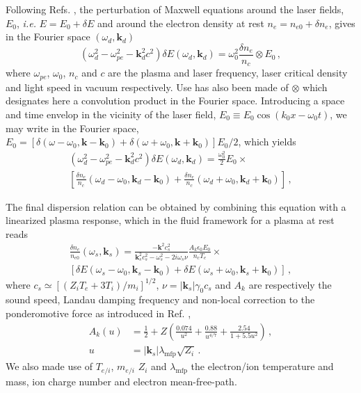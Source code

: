 \documentclass[
 reprint,
 amsmath,amssymb,
 aps,
]{revtex4-1}
\begin{document}
Following Refs. \cite[]{Kruer,phd_Michel}, the perturbation of Maxwell equations around the laser fields, $E_0$, \emph{i.e.} $E = E_0 + \delta E$ and around the  electron density at rest $n_e = n_{e0}+\delta n_e$, gives in the Fourier space $(\omega_d,\mathbf{k}_d)$
\begin{equation}
    (\omega_d^2 - \omega_{pe}^2 -\mathbf{k}_d^2c^2)\delta E(\omega_d,\mathbf{k}_d) = \omega_0^2 \frac{\delta n_e }{n_c}\otimes E_0  \, ,\label{eq:max1}
\end{equation}
where $\omega_{pe}$, $\omega_{0}$,  $n_c$ and $c$ are the plasma and laser frequency, laser critical density and light speed in vacuum respectively. Use has also been made of $\otimes$ which designates  here a convolution product in the Fourier space.
Introducing a space and time envelop in the vicinity of the laser field, $E_0\equiv E_0 \cos(k_0 x - \omega_0t)$,
we may write in the Fourier space,  $E_0 =[ \delta(\omega-\omega_0, \mathbf{k}-\mathbf{k}_0) + \delta(\omega+\omega_0, \mathbf{k}+\mathbf{k}_0) ]E_0/2 $, which yields 
\begin{align}
    (\omega_d^2 - \omega_{pe}^2 -\mathbf{k}_d^2c^2)\delta E(\omega_d,\mathbf{k}_d) = \frac{\omega_0^2}{2} E_0\times \nonumber\\ \left[\frac{\delta n_e }{n_c}(\omega_d-\omega_0, \mathbf{k}_d-\mathbf{k}_0) +\frac{\delta n_e }{n_c}(\omega_d+\omega_0, \mathbf{k}_d+\mathbf{k}_0) \right] \, ,\label{eq:max2}
\end{align}

The final dispersion relation  can be obtained by combining this equation with a linearized plasma response, which in the fluid framework for a plasma at rest %
reads 
\begin{align}
   \frac{\delta n_e }{n_{e0}}(\omega_s,\mathbf{k}_s) = \frac{-\mathbf{k}^2c_s^2}{ \mathbf{k}_s^2c_s^2-\omega_s^2 -2i\omega_s \nu} \frac{A_k\epsilon_0 E_0}{n_c T_e}\times \nonumber\\ \left[\delta E(\omega_s-\omega_0, \mathbf{k}_s-\mathbf{k}_0) +\delta E(\omega_s+\omega_0, \mathbf{k}_s+\mathbf{k}_0) \right] \, ,\label{eq:fluid}
\end{align}
where $c_s\simeq [(Z_iT_e+3 T_i)/m_i]^{1/2}$, $\nu=\vert\mathbf{k}_s\vert \gamma_0 c_s$ and $A_k$ are respectively  the sound speed, Landau damping frequency and non-local correction to the ponderomotive force  as introduced in Ref. \cite[]{Bychenkov_2000}, 
\begin{align}
     A_k(u)   &= \frac{1}{2} +Z\left( \frac{0.074}{u^2}+ \frac{0.88}{u^{4/7}} + \frac{2.54}{1+5.5u^2} \right) \, ,\nonumber \\ 
     u &=\vert \mathbf{k}_s \vert\lambda_\mathrm{mfp} \sqrt{Z_i}\label{eq:nl}\, .
\end{align}
We also made use of $T_{e/i}$, $m_{e/i}$ $Z_i$ and $\lambda_\mathrm{mfp}$ the electron/ion temperature and mass, ion charge number and electron mean-free-path.
\end{document}
